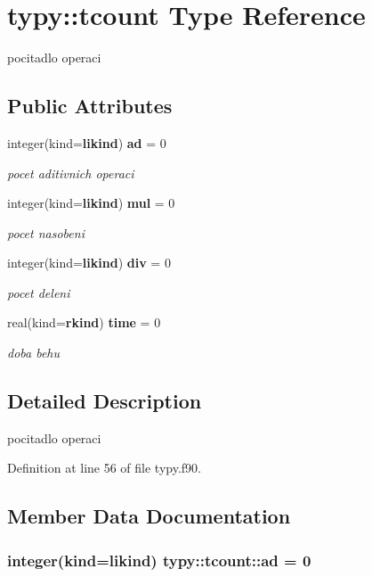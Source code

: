 \section{typy\+:\+:tcount Type Reference}
\label{structtypy_1_1tcount}


pocitadlo operaci  


\subsection*{Public Attributes}
\begin{DoxyCompactItemize}
\item 
integer(kind={\bf likind}) {\bf ad} = 0
\begin{DoxyCompactList}\small\item\em pocet aditivnich operaci \end{DoxyCompactList}\item 
integer(kind={\bf likind}) {\bf mul} = 0
\begin{DoxyCompactList}\small\item\em pocet nasobeni \end{DoxyCompactList}\item 
integer(kind={\bf likind}) {\bf div} = 0
\begin{DoxyCompactList}\small\item\em pocet deleni \end{DoxyCompactList}\item 
real(kind={\bf rkind}) {\bf time} = 0
\begin{DoxyCompactList}\small\item\em doba behu \end{DoxyCompactList}\end{DoxyCompactItemize}


\subsection{Detailed Description}
pocitadlo operaci 

Definition at line 56 of file typy.\+f90.



\subsection{Member Data Documentation}
\subsubsection[{ad}]{\setlength{\rightskip}{0pt plus 5cm}integer(kind={\bf likind}) typy\+::tcount\+::ad = 0}\label{structtypy_1_1tcount_a76331414c9c7faa2ffcef099a188c5a0}


